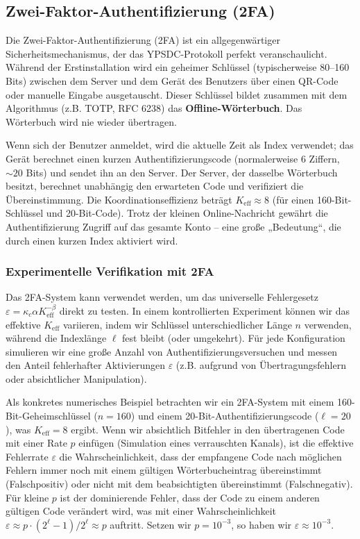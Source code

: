 \documentclass[12pt,a4paper]{article}
\theoremstyle{remark}
\newcommand{\Keff}{K_{\mathrm{eff}}}
\begin{document}
	\subsection{Zwei-Faktor-Authentifizierung (2FA)}
	
	Die Zwei-Faktor-Authentifizierung (2FA) ist ein allgegenwärtiger Sicherheitsmechanismus, der das YPSDC-Protokoll perfekt veranschaulicht. Während der Erstinstallation wird ein geheimer Schlüssel (typischerweise 80–160 Bits) zwischen dem Server und dem Gerät des Benutzers über einen QR-Code oder manuelle Eingabe ausgetauscht. Dieser Schlüssel bildet zusammen mit dem Algorithmus (z.B. TOTP, RFC 6238) das \textbf{Offline-Wörterbuch}. Das Wörterbuch wird nie wieder übertragen.
	
	Wenn sich der Benutzer anmeldet, wird die aktuelle Zeit als Index verwendet; das Gerät berechnet einen kurzen Authentifizierungscode (normalerweise 6 Ziffern, $\sim 20$ Bits) und sendet ihn an den Server. Der Server, der dasselbe Wörterbuch besitzt, berechnet unabhängig den erwarteten Code und verifiziert die Übereinstimmung. Die Koordinationseffizienz beträgt $\Keff \approx 8$ (für einen 160-Bit-Schlüssel und 20-Bit-Code). Trotz der kleinen Online-Nachricht gewährt die Authentifizierung Zugriff auf das gesamte Konto – eine große „Bedeutung“, die durch einen kurzen Index aktiviert wird.
	
	\subsubsection{Experimentelle Verifikation mit 2FA}
	\label{subsec:2fa-experiment}
	
	Das 2FA-System kann verwendet werden, um das universelle Fehlergesetz $\varepsilon = \kappa_c \alpha K_{\mathrm{eff}}^{-\beta}$ direkt zu testen. In einem kontrollierten Experiment können wir das effektive $\Keff$ variieren, indem wir Schlüssel unterschiedlicher Länge $n$ verwenden, während die Indexlänge $\ell$ fest bleibt (oder umgekehrt). Für jede Konfiguration simulieren wir eine große Anzahl von Authentifizierungsversuchen und messen den Anteil fehlerhafter Aktivierungen $\varepsilon$ (z.B. aufgrund von Übertragungsfehlern oder absichtlicher Manipulation).
	
	Als konkretes numerisches Beispiel betrachten wir ein 2FA-System mit einem 160-Bit-Geheimschlüssel ($n=160$) und einem 20-Bit-Authentifizierungscode ($\ell=20$), was $\Keff = 8$ ergibt. Wenn wir absichtlich Bitfehler in den übertragenen Code mit einer Rate $p$ einfügen (Simulation eines verrauschten Kanals), ist die effektive Fehlerrate $\varepsilon$ die Wahrscheinlichkeit, dass der empfangene Code nach möglichen Fehlern immer noch mit einem gültigen Wörterbucheintrag übereinstimmt (Falschpositiv) oder nicht mit dem beabsichtigten übereinstimmt (Falschnegativ). Für kleine $p$ ist der dominierende Fehler, dass der Code zu einem anderen gültigen Code verändert wird, was mit einer Wahrscheinlichkeit $\varepsilon \approx p \cdot (2^\ell -1)/2^\ell \approx p$ auftritt. Setzen wir $p = 10^{-3}$, so haben wir $\varepsilon \approx 10^{-3}$.
	
\end{document}
